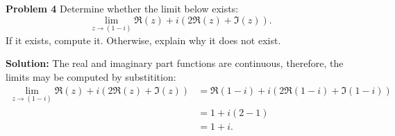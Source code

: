 \documentclass[12pt,oneside]{exam}
\newenvironment{exercise}[1]{\vspace{.1in}\noindent\textbf{Problem #1 \hspace{.05em}}}{}
\begin{document}
\begin{exercise}{4}
Determine whether the limit below exists:
\begin{equation*}
\lim_{z \to (1-i)} \Re(z)+i(2\Re(z) + \Im(z)).
\end{equation*}
If it exists, compute it. Otherwise, explain why it does not exist. 
\end{exercise}

\textbf{Solution:} The real and imaginary part functions are continuous, therefore, the limits may be computed by substitition:
\begin{align*}
\lim_{z \to (1-i)} \Re(z)+i(2\Re(z) + \Im(z)) & = \Re(1-i) +i(2\Re(1-i)+\Im(1-i))\\
& = 1+i(2-1)\\
& = 1+i.
\end{align*}
\vfill
\end{document}
